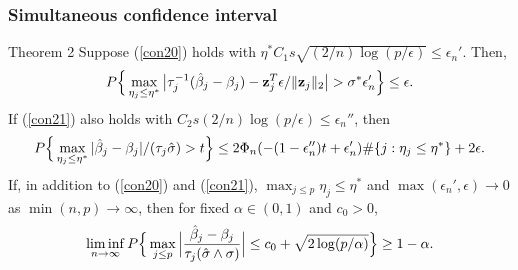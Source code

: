 \begin{frame}
\frametitle{Simultaneous confidence interval}
\begin{block}{Theorem 2}
\scriptsize
Suppose (\ref{con20}) holds with $\eta^*C_1s \sqrt{(2/n)\log(p/\epsilon)} \le \epsilon_n'$. Then,
\begin{equation}
\setlength{\abovedisplayskip}{3pt}
\setlength{\belowdisplayskip}{3pt}
\label{th2-27}
P\Big\{ \max_{\eta_j\le \eta^*} \big|\tau_j^{-1}(\hat{\beta}_j - \beta_j) - \bz_j^T\epsilon/\|\bz_j\|_2\big|
> \sigma^* \epsilon_n'\Big\}\le\epsilon.
\end{equation}
If (\ref{con21}) also holds with $C_2 s (2/n)\log(p/\epsilon)\le \epsilon_n''$, then
\begin{equation}
\setlength{\abovedisplayskip}{3pt}
\setlength{\belowdisplayskip}{3pt}
\label{th2-28}
P\Big\{ \max_{\eta_j\le \eta^*} |\hat{\beta}_j - \beta_j|/(\tau_j\hat{\sigma}) > t\Big\}
\le 2\Phi_n( - (1-\epsilon_n'')t + \epsilon_n')\#\{j:\eta_j\le\eta^*\}+2\epsilon.
\end{equation}
If, in addition to (\ref{con20}) and (\ref{con21}),
$\max_{j\le p}\eta_j\le \eta^*$ and $\max(\epsilon_n',\epsilon)\to 0$ as $\min(n,p)\to \infty$,
then for fixed $\alpha\in (0,1)$ and $c_0>0$,
\begin{equation}
\setlength{\abovedisplayskip}{3pt}
\setlength{\belowdisplayskip}{3pt}
\label{th2-29}
\liminf_{n\to \infty} P\Big\{ \max_{j\le p} \Big|\frac{\hat{\beta}_j - \beta_j}{\tau_j(\hat{\sigma}\wedge \sigma)}\Big|
\le  c_0 + \sqrt{2\log(p/\alpha)}\Big\}  \ge 1-\alpha.
\end{equation}
\end{block}
\end{frame}

